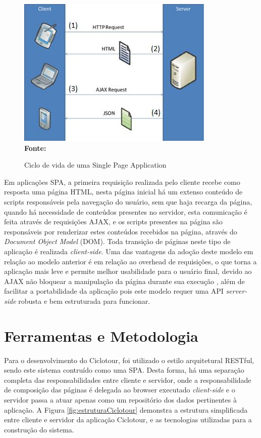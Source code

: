 \begin{figure}[!ht]
	\centering	
	\caption[\hspace{0.1cm} Ciclo de vida de uma Single Page Application.]{Ciclo de vida de uma Single Page Application}
	  \vspace{-0.4cm}
	\includegraphics[width=.8\textwidth]{figuras/spa.png}
	 \vspace{-0.3cm}
	\\\textbf{\footnotesize Fonte: \cite{spa02}}
	\label{fig:spa}
\end{figure}

Em aplicações SPA, a primeira requisição realizada pelo cliente recebe como resposta uma página HTML, nesta página inicial há um extenso conteúdo de
scripts responsáveis pela navegação do usuário, sem que haja recarga da página, quando há necessidade de conteúdos presentes no servidor, esta 
comunicação é feita através de requisições AJAX, e os scripts presentes na página são responsáveis por renderizar estes conteúdos recebidos na página,
através do \textit{Document Object Model} (DOM). Toda transição de páginas neste tipo de aplicação é realizada \textit{client-side}. Uma das vantagens
da adoção deste modelo em relação ao modelo anterior é em relação ao overhead de requisições, o que torna a aplicação mais leve e permite melhor 
usabilidade para o usuário final, devido ao AJAX não bloquear a manipulação da página durante sua execução \cite{spa01}, além de facilitar a 
portabilidade da aplicação pois este modelo requer uma API \textit{server-side} robusta e bem estruturada para funcionar.

\section{\esp Ferramentas e Metodologia}
Para o desenvolvimento do Ciclotour, foi utilizado o estilo arquitetural RESTful, sendo este sistema contruído como uma SPA. Desta forma, há
uma separação completa das responsabilidades entre cliente e servidor, onde a responsabilidade de composição das páginas é delegada ao browser
executado \textit{client-side} e o servidor passa a atuar apenas como um repositório dos dados pertinentes à aplicação. A Figura 
\ref{fig:estruturaCiclotour} demonstra a estrutura simplificada entre cliente e servidor da aplicação Ciclotour, e as tecnologias utilizadas para
a construção do sistema.

